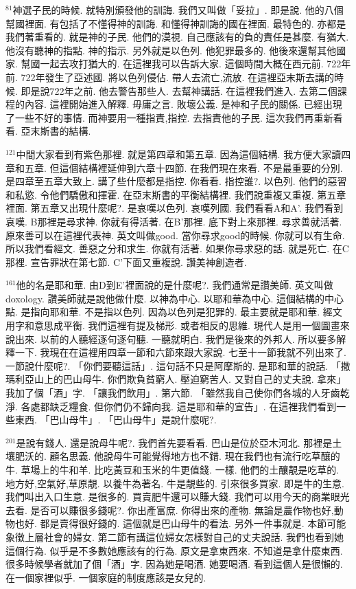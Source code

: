\documentclass{book}
\begin{document}
$^{81}$神選子民的時候.
就特別頒發他的訓誨.
我們又叫做「妥拉」.
即是說.
他的八個幫國裡面.
有包括了不懂得神的訓誨.
和懂得神訓誨的國在裡面.
最特色的.
亦都是我們著重看的.
就是神的子民.
他們的漠視.
自己應該有的負的責任是甚麼.
有猶大.
他沒有聽神的指點.
神的指示.
另外就是以色列.
他犯罪最多的.
他後來還幫其他國家.
幫國一起去攻打猶大的.
在這裡我可以告訴大家.
這個時間大概在西元前.
722年前.
722年發生了亞述國.
將以色列侵佔.
帶人去流亡,流放.
在這裡亞末斯去講的時候.
即是說722年之前.
他去警告那些人.
去幫神講話.
在這裡我們進入.
去第二個課程的內容.
這裡開始進入解釋.
毋庸之言.
敗壞公義.
是神和子民的關係.
已經出現了一些不好的事情.
而神要用一種指責,指控.
去指責他的子民.
這次我們再重新看看.
亞末斯書的結構.

$^{121}$中間大家看到有紫色那裡.
就是第四章和第五章.
因為這個結構.
我方便大家讀四章和五章.
但這個結構裡延伸到六章十四節.
在我們現在來看.
不是最重要的分別.
是四章至五章大致上.
講了些什麼都是指控.
你看看.
指控誰?.
以色列.
他們的惡習和私慾.
令他們驕傲和揮霍.
在亞末斯書的平衡結構裡.
我們說重複又重複.
第五章裡面.
第五章又出現什麼呢?.
是哀嘆以色列.
哀嘆列國.
我們看看A和A'.
我們看到哀嘆.
B那裡是尋求神.
你就有得活著.
在B'那裡.
底下對上來那裡.
尋求善就活著.
原來善可以在這裡代表神.
英文叫做good.
當你尋求good的時候.
你就可以有生命.
所以我們看經文.
善惡之分和求生.
你就有活著.
如果你尋求惡的話.
就是死亡.
在C那裡.
宣告罪狀在第七節.
C'下面又重複說.
讚美神創造者.

$^{161}$他的名是耶和華.
由D到E'裡面說的是什麼呢?.
我們通常是讚美師.
英文叫做doxology.
讚美師就是說他做什麼.
以神為中心.
以耶和華為中心.
這個結構的中心點.
是指向耶和華.
不是指以色列.
因為以色列是犯罪的.
最主要就是耶和華.
經文用字和意思成平衡.
我們這裡有提及梯形.
或者相反的思維.
現代人是用一個圖畫來說出來.
以前的人聽經逐句逐句聽.
一聽就明白.
我們是後來的外邦人.
所以要多解釋一下.
我現在在這裡用四章一節和六節來跟大家說.
七至十一節我就不列出來了.
一節說什麼呢?.
「你們要聽這話」.
這句話不只是阿摩斯的.
是耶和華的說話.
「撒瑪利亞山上的巴山母牛.
你們欺負貧窮人.
壓迫窮苦人.
又對自己的丈夫說.
拿來」我加了個「酒」字.
「讓我們飲用」.
第六節.
「雖然我自己使你們各城的人牙齒乾淨.
各處都缺乏糧食.
但你們仍不歸向我.
這是耶和華的宣告」.
在這裡我們看到一些東西.
「巴山母牛」.
「巴山母牛」是說什麼呢?.

$^{201}$是說有錢人.
還是說母牛呢?.
我們首先要看看.
巴山是位於亞木河北.
那裡是土壤肥沃的.
顧名思義.
他說母牛可能覺得地方也不錯.
現在我們也有流行吃草釀的牛.
草場上的牛和羊.
比吃黃豆和玉米的牛更值錢.
一樣.
他們的土釀靚是吃草的.
地方好,空氣好,草原靚.
以養牛為著名.
牛是靚些的.
引來很多買家.
即是牛的生意.
我們叫出入口生意.
是很多的.
買賣肥牛還可以賺大錢.
我們可以用今天的商業眼光去看.
是否可以賺很多錢呢?.
你出產富庶.
你得出來的產物.
無論是農作物也好,動物也好.
都是賣得很好錢的.
這個就是巴山母牛的看法.
另外一件事就是.
本節可能象徵上層社會的婦女.
第二節有講這位婦女怎樣對自己的丈夫說話.
我們也看到她這個行為.
似乎是不多數她應該有的行為.
原文是拿東西來.
不知道是拿什麼東西.
很多時候學者就加了個「酒」字.
因為她是喝酒.
她要喝酒.
看到這個人是很懶的.
在一個家裡似乎.
一個家庭的制度應該是女兒的.
\end{document}
